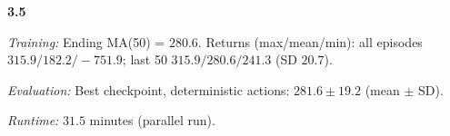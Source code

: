 \noindent\textbf{3.5}\par
\emph{Training:} Ending MA(50) = $280.6$. Returns (max/mean/min): all episodes $315.9/182.2/-751.9$; last 50 $315.9/280.6/241.3$ (SD $20.7$).\par
\emph{Evaluation:} Best checkpoint, deterministic actions: $281.6\pm 19.2$ (mean $\pm$ SD).\par
\emph{Runtime:} $31.5$ minutes (parallel run).\par
